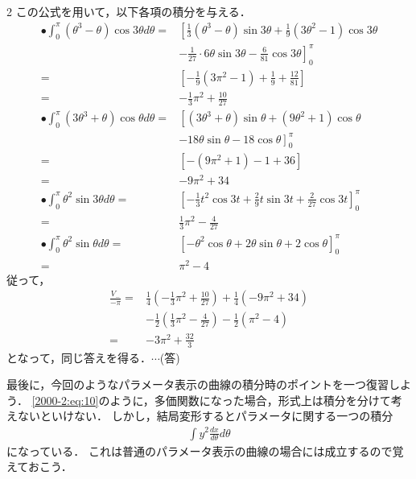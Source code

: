 \documentclass[../../main.tex]{subfiles}
\begin{document}
\begin{multicols}{2}
  この公式を用いて，以下各項の積分を与える．
  \begin{align*}
    \bullet \int_0^\pi (\theta^3-\theta) \cos 3\theta d\theta
    = & \left[ \frac{1}{3}(\theta^3-\theta) \sin 3\theta + \frac{1}{9}(3\theta^2-1) \cos 3\theta \right. \\
      & \left. - \frac{1}{27} \cdot 6\theta \sin 3\theta- \frac{6}{81} \cos 3\theta \right]_0^\pi        \\
    = & \left[ -\frac{1}{9}(3\pi^2-1) + \frac{1}{9}+\frac{12}{81} \right]                                \\
    = & -\frac{1}{3}\pi^2 + \frac{10}{27}                                                                \\
    \bullet \int_0^\pi (3\theta^3+\theta) \cos\theta d\theta
    = & \left[ (3\theta^3+\theta) \sin\theta + (9\theta^2+1) \cos\theta \right.                          \\
      & \left. - 18\theta\sin\theta - 18\cos\theta \right]_0^\pi                                         \\
    = & [-(9\pi^2+1) - 1 + 36]                                                                           \\
    = & -9\pi^2 + 34                                                                                     \\
    \bullet \int_0^\pi \theta^2 \sin 3\theta d\theta
    = & \left[ -\frac{1}{3}t^2 \cos 3t + \frac{2}{9}t \sin 3t + \frac{2}{27} \cos 3t \right]_0^\pi       \\
    = & \frac{1}{3}\pi^2 - \frac{4}{27}                                                                  \\
    \bullet \int_0^\pi \theta^2 \sin \theta d\theta
    = & \left[ - \theta^2 \cos \theta + 2 \theta \sin \theta + 2\cos \theta \right]_0^\pi                \\
    = & \pi^2 -4
  \end{align*}
  従って，
  \begin{align*}
    \frac{V_{-}}{-\pi}
    = & \frac{1}{4}\left(-\frac{1}{3}\pi^2 + \frac{10}{27}\right) + \frac{1}{4}(-9\pi^2+34)          \\
      & - \frac{1}{2}\left(\frac{1}{3}\pi^2 - \frac{4}{27}\right) - \frac{1}{2}\left(\pi^2 -4\right) \\
    = & -3\pi^2 + \frac{32}{3}
  \end{align*}
  となって，同じ答えを得る．$\cdots$(答)

  最後に，今回のようなパラメータ表示の曲線の積分時のポイントを一つ復習しよう．
  \cref{2000-2:eq:10}のように，多価関数になった場合，形式上は積分を分けて考えないといけない．
  しかし，結局変形するとパラメータに関する一つの積分
  \begin{align*}
    \int y^2\frac{dx}{d\theta} d\theta
  \end{align*}
  になっている．
  これは普通のパラメータ表示の曲線の場合には成立するので覚えておこう．


  \newpage
\end{multicols}
\end{document}
